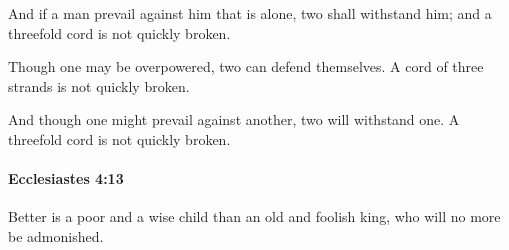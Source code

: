 			\begin{versebox}
					\item[BHS] 
					\item[LXX] 
					\item[ASV] And if a man prevail against him that is alone, two shall withstand him; and a threefold cord is not quickly broken.
					\item[NIV] Though one may be overpowered, two can defend themselves. A cord of three strands is not quickly broken.
					\item[NRSV] And though one might prevail against another, two will withstand one. A threefold cord is not quickly broken.
			\end{versebox}

		\paragraph{Ecclesiastes 4:13} %
			\label{ECCLESIASTES-4-13}

			Better is a poor and a wise child than an old and foolish king, who will no more be admonished.

